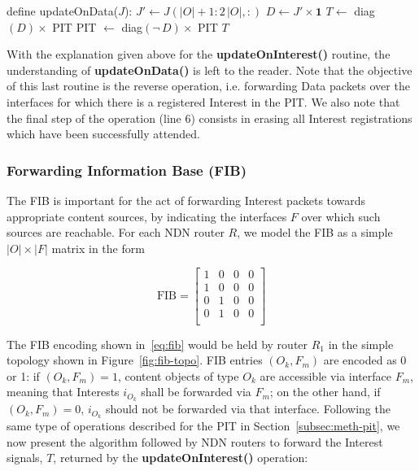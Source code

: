 \begin{algorithmic}[1]

\State define updateOnData($J$):
\State
    \State $J' \leftarrow J(|O|+1:2\,|O|,:)$
    \State $D \leftarrow J' \times \textbf{1}$
    \State $T \leftarrow$ diag$(D) \times$ PIT
    \State PIT $\leftarrow$ diag$(\neg\,D) \times$ PIT
    \State \Return $T$

\end{algorithmic}\shortvertbreak

With the explanation given above for the \textbf{updateOnInterest()} routine, 
the understanding of \textbf{updateOnData()} is left to the reader. Note that 
the objective of this last routine is the reverse operation, i.e. forwarding Data 
packets over the interfaces for which there is a registered Interest in the PIT. We 
also note that the final step of the operation (line 6) consists in erasing 
all Interest registrations which have been successfully attended.\shortvertbreak

\subsubsection{Forwarding Information Base (FIB)}
\label{subsec:meth-fib}

The FIB is important for the act of forwarding Interest packets towards 
appropriate content sources, by indicating the interfaces $F$ over which such 
sources are reachable. For each NDN router $R$, we model the FIB as a simple 
$|O| \times |F|$ matrix in the form

\begin{equation}
\text{FIB} = \begin{bmatrix} 1 & 0 & 0 & 0  \\ 
                1 & 0 & 0 & 0               \\ 
                0 & 1 & 0 & 0               \\ 
                0 & 1 & 0 & 0               \\ \end{bmatrix}
    \label{eq:fib}
\end{equation}\shortvertbreak

The FIB encoding shown in~\ref{eq:fib} would be held by router $R_1$ in the 
simple topology shown in Figure~\ref{fig:fib-topo}. FIB entries 
$(O_k,F_m)$ are encoded as 0 or 1: if $(O_k,F_m) = 1$, content objects of 
type $O_k$ are accessible via interface $F_m$, meaning that Interests 
$i_{O_k}$ shall be forwarded via $F_m$; on the other hand, 
if $(O_k,F_m) = 0$, $i_{O_k}$ should not be forwarded via that interface. 
Following the same type of operations described for the PIT 
in Section~\ref{subsec:meth-pit}, we now present the algorithm followed by NDN 
routers to forward the Interest signals, $T$, returned by the 
\textbf{updateOnInterest()} operation:\shortvertbreak 

